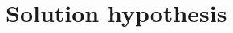 \documentclass[../main.tex]{subfiles}
\begin{document}
\section{Solution hypothesis}

\blindtext
\end{document}
